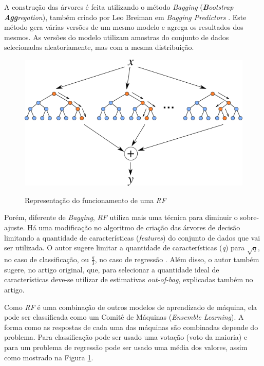 A construção das árvores é feita utilizando o método \textit{Bagging} (\textit{\textbf{B}ootstrap \textbf{Agg}regation}), também criado por Leo Breiman em \textit{Bagging Predictors} \cite{Breiman:1996:BP:231986.231989}. Este método gera várias versões de um mesmo modelo e agrega os resultados dos mesmos. As versões do modelo utilizam amostras do conjunto de dados selecionadas aleatoriamente, mas com a mesma distribuição.

\begin{figure}[htbp]
    \centering
    \includegraphics[scale=1.0]{monography/img/models/random_forest.png}
    \label{figure:random_forest}
    \caption[Representação do funcionamento de uma \textit{\acrshort{RF}}]{Representação do funcionamento de uma \textit{\acrshort{RF}}\footnotemark}
\end{figure}

Porém, diferente de \textit{Bagging}, \textit{\acrshort{RF}} utiliza mais uma técnica para diminuir o sobre-ajuste. Há uma modificação no algoritmo de criação das árvores de decisão limitando a quantidade de características (\textit{features}) do conjunto de dados que vai ser utilizada. O autor sugere limitar a quantidade de características (\textit{q}) para $ \sqrt{q} $, no caso de classificação, ou $ \frac{q}{3} $, no caso de regressão \cite{hastie2005elements}. Além disso, o autor também sugere, no artigo original, que, para selecionar a quantidade ideal de características deve-se utilizar de estimativas \textit{out-of-bag}, explicadas também no artigo.

Como \textit{\acrshort{RF}} é uma combinação de outros modelos de aprendizado de máquina, ela pode ser classificada como um Comitê de Máquinas (\textit{Ensemble Learning}). A forma como as respostas de cada uma das máquinas são combinadas depende do problema. Para classificação pode ser usado uma votação (voto da maioria) e para um problema de regressão pode ser usado uma média dos valores, assim como mostrado na Figura \ref{figure:random_forest}.

